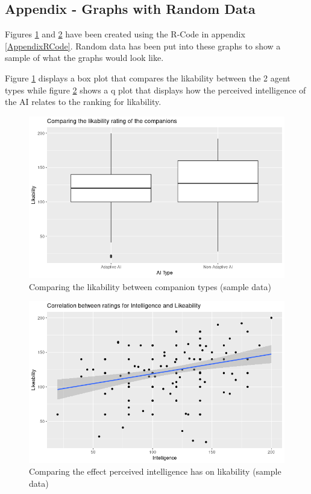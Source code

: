 \documentclass{IEEEtran}
\begin{document}
\subsection{Appendix - Graphs with Random Data}

Figures \ref{fig:LikabilityRplot} and \ref{fig:IntelligenceLikabilityRplot} have been created using the R-Code in appendix \ref{AppendixRCode}. Random data has been put into these graphs to show a sample of what the graphs would look like.

Figure \ref{fig:LikabilityRplot} displays a box plot that compares the likability between the 2 agent types while figure \ref{fig:IntelligenceLikabilityRplot} shows a q plot that displays how the perceived intelligence of the AI relates to the ranking for likability.

\label{AppendixGraphs}
\begin{figure}[h!]
  \centering
  \includegraphics[width=\linewidth]{Images/Graphs/LikabilityRplot.png}
  
\caption{Comparing the likability between companion types (sample data)}
\label{fig:LikabilityRplot}
\end{figure}

\begin{figure}[h!]
  \centering
  \includegraphics[width=\linewidth]{Images/Graphs/IntelligenceLikabilityRplot.png}
  
\caption{Comparing the effect perceived intelligence has on likability (sample data)}
\label{fig:IntelligenceLikabilityRplot}
\end{figure}
\end{document}
